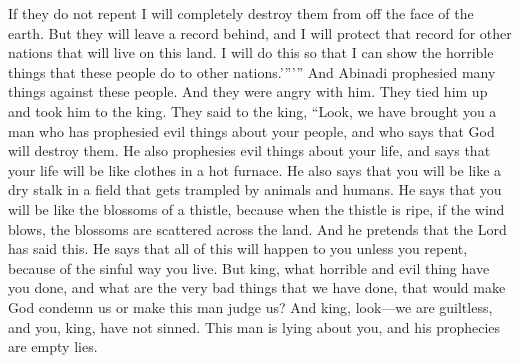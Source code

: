 If they do not repent I will completely destroy them from off the face of the earth. But they will leave a record behind, and I will protect that record for other nations that will live on this land. I will do this so that I can show the horrible things that these people do to other nations.\rq ''\rq '' And Abinadi prophesied many things against these people.
\bverse \iffalse And it came to pass that they were angry with him; and they took him and carried him bound before the king, and said unto the king: Behold, we have brought a man before thee who has prophesied evil concerning thy people, and saith that God will destroy them. \fi
And they were angry with him. They tied him up and took him to the king. They said to the king, ``Look, we have brought you a man who has prophesied evil things about your people, and who says that God will destroy them.
\bverse \iffalse And he also prophesieth evil concerning thy life, and saith that thy life shall be as a garment in a furnace of fire. \fi
He also prophesies evil things about your life, and says that your life will be like clothes in a hot furnace.
\bverse \iffalse And again, he saith that thou shalt be as a stalk, even as a dry stalk of the field, which is run over by the beasts and trodden under foot. \fi
He also says that you will be like a dry stalk in a field that gets trampled by animals and humans.
\bverse \iffalse And again, he saith thou shalt be as the blossoms of a thistle, which, when it is fully ripe, if the wind bloweth, it is driven forth upon the face of the land. And he pretendeth the Lord hath spoken it. And he saith all this shall come upon thee except thou repent, and this because of thine iniquities. \fi
He says that you will be like the blossoms of a thistle, because when the thistle is ripe, if the wind blows, the blossoms are scattered across the land. And he pretends that the Lord has said this. He says that all of this will happen to you unless you repent, because of the sinful way you live.
\bverse \iffalse And now, O king, what great evil hast thou done, or what great sins have thy people committed, that we should be condemned of God or judged of this man? \fi
But king, what horrible and evil thing have you done, and what are the very bad things that we have done, that would make God condemn us or make this man judge us?
\bverse \iffalse And now, O king, behold, we are guiltless, and thou, O king, hast not sinned; therefore, this man has lied concerning you, and he has prophesied in vain. \fi
And king, look---we are guiltless, and you, king, have not sinned. This man is lying about you, and his prophecies are empty lies.
